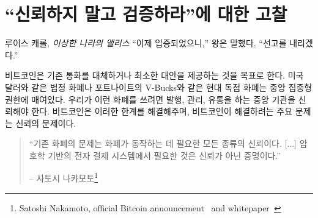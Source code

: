 \chapter{ \enquote{신뢰하지 말고 검증하라}에 대한 고찰}
\label{les:16}

\begin{comment}
	\begin{chapquote}{Lewis Carroll, \textit{Alice in Wonderland}}
		\enquote{Now for the evidence,} said the King, \enquote{and then the sentence.}
	\end{chapquote}
\end{comment}
\begin{chapquote}{루이스 캐롤, \textit{이상한 나라의 앨리스}}
	\enquote{이제 입증되었으니,} 왕은 말했다, \enquote{선고를 내리겠다.}
\end{chapquote}

\begin{comment}
	Bitcoin aims to replace, or at least provide an alternative to,
	conventional currency. Conventional currency is bound to a centralized
	authority, no matter if we are talking about legal tender like the US
	dollar or modern monopoly money like Fortnite's V-Bucks. In both
	examples, you are bound to trust the central authority to issue, manage
	and circulate your money. Bitcoin unties this bound, and the main issue
	Bitcoin solves is the issue of \textit{trust}.
\end{comment}
비트코인은 기존 통화를 대체하거나 최소한 대안을 제공하는 것을 목표로 한다.
미국 달러와 같은 법정 화폐나 포트나이트의 V-Bucks와 같은 현대 독점 화폐는 중앙 집중형 권한에 매여있다.
우리가 이런 화폐를 쓰려면 발행, 관리, 유통을 하는 중앙 기관을 신뢰해야 한다. 
비트코인은 이러한 한계를 해결해주며, 비트코인이 해결하려는 주요 문제는 신뢰의 문제이다. 


\begin{quotation}\begin{samepage}
		\enquote{기존 화폐의 문제는 화폐가 동작하는 데 필요한 모든 종류의 신뢰이다. [...] 
			암호학 기반의 전자 결제 시스템에서 필요한 것은 신뢰가 아닌 증명이다.}
		\begin{flushright} -- 사토시 나카모토\footnote{Satoshi Nakamoto, official Bitcoin announcement~\cite{bitcoin-announcement} and whitepaper~\cite{whitepaper}}
\end{flushright}\end{samepage}\end{quotation}

